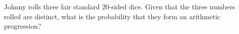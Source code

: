 Johnny rolls three fair standard $20$-sided dice. Given that the three numbers rolled are distinct, what is the probability that they form an arithmetic progression?
